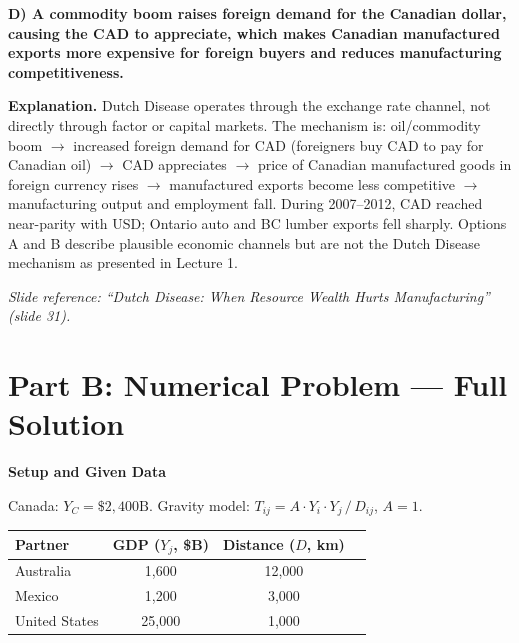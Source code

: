 \documentclass[11pt]{article}
\begin{document}
\begin{correctbox}
\textbf{D) A commodity boom raises foreign demand for the Canadian dollar, causing the CAD to appreciate, which makes Canadian manufactured exports more expensive for foreign buyers and reduces manufacturing competitiveness.}
\end{correctbox}

\medskip
\noindent\textbf{Explanation.}\enspace
Dutch Disease operates through the exchange rate channel, not directly through
factor or capital markets. The mechanism is: oil/commodity boom $\to$ increased
foreign demand for CAD (foreigners buy CAD to pay for Canadian oil) $\to$ CAD
appreciates $\to$ price of Canadian manufactured goods in foreign currency rises
$\to$ manufactured exports become less competitive $\to$ manufacturing output and
employment fall. During 2007--2012, CAD reached near-parity with USD; Ontario auto
and BC lumber exports fell sharply. Options A and B describe plausible economic
channels but are not the Dutch Disease mechanism as presented in Lecture 1.

\textit{Slide reference: ``Dutch Disease: When Resource Wealth Hurts Manufacturing'' (slide 31).}

\clearpage

\section{Part B: Numerical Problem — Full Solution}

\medskip
\noindent\textbf{Setup and Given Data}

\medskip
\begin{databox}
\small
Canada: $Y_C = \$2{,}400\text{B}$.
\quad Gravity model: $T_{ij} = A\cdot Y_i\cdot Y_j\,/\,D_{ij}$, $A=1$.

\medskip
\begin{tabular}{lccc}
\toprule
\textbf{Partner} & \textbf{GDP ($Y_j$, \$B)} & \textbf{Distance ($D$, km)}\\
\midrule
Australia   & 1{,}600  & 12{,}000 \\
Mexico      & 1{,}200  & 3{,}000  \\
United States & 25{,}000 & 1{,}000 \\
\bottomrule
\end{tabular}
\end{databox}

\bigskip
\end{document}
